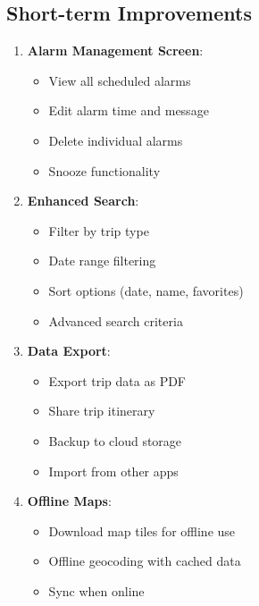 \documentclass[12pt,a4paper]{article}
\begin{document}
\subsection{Short-term Improvements}
\begin{enumerate}
    \item \textbf{Alarm Management Screen}:
    \begin{itemize}
        \item View all scheduled alarms
        \item Edit alarm time and message
        \item Delete individual alarms
        \item Snooze functionality
    \end{itemize}

    \item \textbf{Enhanced Search}:
    \begin{itemize}
        \item Filter by trip type
        \item Date range filtering
        \item Sort options (date, name, favorites)
        \item Advanced search criteria
    \end{itemize}

    \item \textbf{Data Export}:
    \begin{itemize}
        \item Export trip data as PDF
        \item Share trip itinerary
        \item Backup to cloud storage
        \item Import from other apps
    \end{itemize}

    \item \textbf{Offline Maps}:
    \begin{itemize}
        \item Download map tiles for offline use
        \item Offline geocoding with cached data
        \item Sync when online
    \end{itemize}
\end{enumerate}
\end{document}
